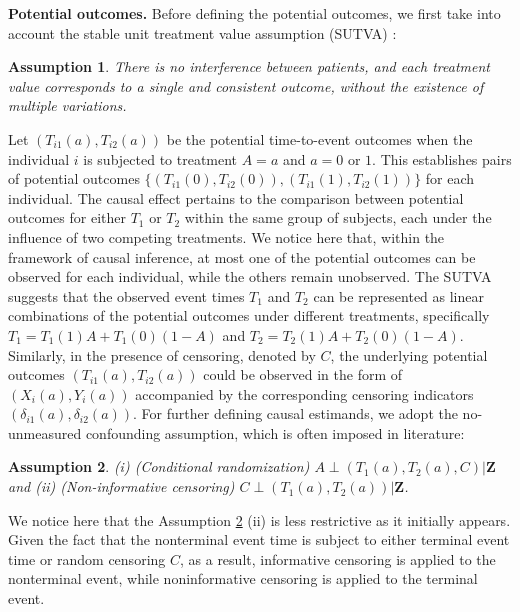 \documentclass[12pt]{article}
\theoremstyle{plain}
\newtheorem{assum}{Assumption}
\def\bfZ{\mathbf{Z}}
\begin{document}
\textbf{Potential outcomes.} Before defining the potential outcomes, we first take into account the stable unit treatment value assumption (SUTVA) \citep{rubin1990comment}:
\begin{assum}
There is no interference between patients, and each treatment value corresponds to a single and consistent outcome, without the existence of multiple variations.
\label{assum:sutva}
\end{assum} 
Let $(T_{i1}(a),T_{i2}(a))$ be the potential time-to-event outcomes when the individual $i$ is subjected to treatment $A=a$ and $a=0$ or $1$. This establishes pairs of potential outcomes  $\{(T_{i1}(0),T_{i2}(0)),(T_{i1}(1),T_{i2}(1))\}$ for each individual. 
The causal effect pertains to the comparison between potential outcomes for either $T_1$ or $T_2$ within the same group of subjects, each under the influence of two competing treatments. We notice here that, within the framework of causal inference, at most one of the potential outcomes can be observed for each individual, while the others remain unobserved.  The SUTVA suggests that the observed event times $T_1$ and $T_2$ can be represented as linear combinations of the potential outcomes under different treatments, specifically $T_1=T_1(1)A+T_1(0)(1-A)$ and $T_2 = T_2(1)A+T_2(0)(1-A)$. 
Similarly, in the presence of censoring, denoted by $C$, the underlying potential outcomes $(T_{i1}(a),T_{i2}(a))$ could be observed in the form of $(X_{i}(a),Y_{i}(a))$ accompanied by the corresponding censoring indicators $(\delta_{i1}(a),\delta_{i2}(a))$. 
For further defining causal estimands, we adopt the no-unmeasured confounding assumption, which is often imposed in literature: 
\begin{assum} 
(i) (Conditional randomization) $A\perp (T_1(a), T_2(a), C)|\bfZ$
and (ii) (Non-informative censoring)  $C\perp (T_1(a), T_2(a))|\bfZ$.
\label{assum:random}
\end{assum}


We notice here that the Assumption \ref{assum:random} (ii) is less restrictive as it initially appears. Given the fact that the nonterminal event time is subject to either terminal event time or random censoring $C$, as a result, informative censoring is applied to the nonterminal event, while noninformative censoring is applied to the terminal event.
\end{document}
